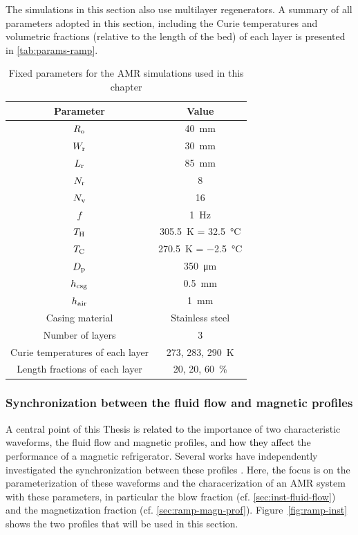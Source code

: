 \documentclass[referee]{svjour3}
\begin{document}
The simulations in this section also use multilayer regenerators. A summary of all parameters adopted in this section, including the Curie temperatures and volumetric fractions (relative to the length of the bed) of each layer is presented in \autoref{tab:params-ramp}.

\begin{table}[!ht]
  \centering
  \begin{tabular}{c|c}
\hline
    \textbf{Parameter} & \textbf{Value} \\
\hline
$R_{\mathrm{o}}$ & \SI{40}{\mm} \\
$W_{\mathrm{r}}$ & \SI{30}{\mm} \\
$L_{\mathrm{r}}$ & \SI{85}{\mm} \\
$N_{\mathrm{r}}$ & \num{8} \\
$N_{\mathrm{v}}$ & \num{16} \\
$f$ & \SI{1}{\hertz} \\
$T_{\mathrm{H}}$ & \SI{305.5}{\kelvin} = \SI{32.5}{\celsius} \\
$T_{\mathrm{C}}$ & \SI{270.5}{\kelvin} = \SI{-2.5}{\celsius} \\
$D_{\mathrm{p}}$ & \SI{350}{\micro\meter} \\
$h_{\mathrm{csg}}$ & \SI{0.5}{\mm} \\
$h_{\mathrm{air}}$ & \SI{1}{\mm} \\
Casing material & Stainless steel \\
Number of layers & \num{3} \\
Curie temperatures of each layer & \num{273}, \num{283}, \SI{290}{\kelvin} \\ 
Length fractions of each layer & \num{20}, \num{20}, \SI{60}{\percent}\\
\hline
  \end{tabular}
  \caption{Fixed parameters for the AMR simulations used in this chapter}
  \label{tab:params-ramp}
\end{table}


\subsubsection{Synchronization between \textcolor{black}{the} fluid flow and magnetic profiles}
\label{sec:synchr-betw-fluid}

A central point of this Thesis is \textcolor{black}{related to} the importance of two characteristic waveforms, the fluid flow and magnetic profiles, \textcolor{black}{and how they affect} the performance of a magnetic refrigerator. Several works have independently investigated the synchronization between these profiles \cite{bib:bjoerk11_amr,bib:nakashima17-exper}. Here, \textcolor{black}{the} focus is  on the parameterization of these waveforms and \textcolor{black}{the} characerization of an AMR system with these parameters, in particular the blow fraction (cf. \autoref{sec:inst-fluid-flow}) and the magnetization fraction (cf. \autoref{sec:ramp-magn-prof}). Figure~\ref{fig:ramp-inst} shows the two profiles that will be used in this section.
\end{document}
